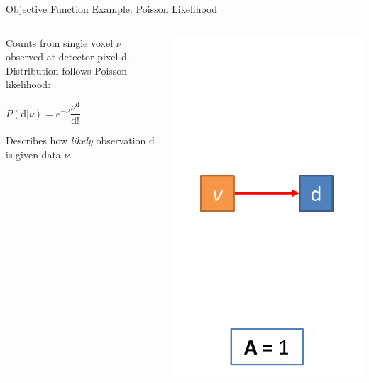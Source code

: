 \begin{frame}[c]{Objective Function Example: Poisson Likelihood}
    \begin{columns}[c,onlytextwidth]
        \begin{column}[c]{0.6\textwidth}
            Counts from single voxel $\nu$ observed at detector pixel d.\\[0.2cm]
            Distribution follows Poisson likelihood:\\[0.2cm]
            \begin{centering}
                $P(\text{d}|\nu) = e^{-\nu}\dfrac{\nu^{\text{d}}}{\text{d}!}$\\[0.2cm]
            \end{centering}
            Describes how \emph{likely} observation d is given data $\nu$.
        \end{column}\begin{column}[c]{0.4\textwidth}
            \begin{centering}
                \includegraphics[height=0.75\textheight]{images/mleA}\\
            \end{centering}

        \end{column}
    \end{columns}

\end{frame}

